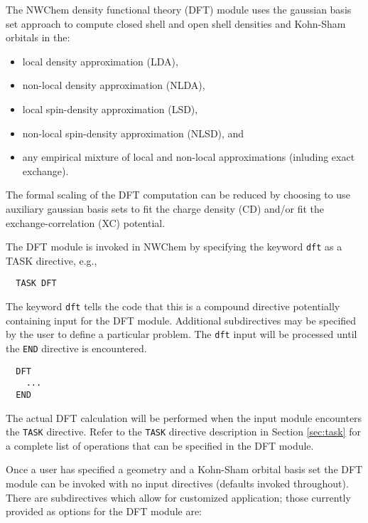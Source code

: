 \label{sec:dft}

The NWChem density functional theory (DFT) module uses the
gaussian basis set approach to compute
closed shell and open shell densities and Kohn-Sham orbitals
in the: 
\begin{itemize}
\item local density approximation (LDA), 
\item non-local density approximation (NLDA), 
\item local spin-density approximation (LSD), 
\item non-local spin-density approximation (NLSD), and
\item any empirical mixture of local and non-local approximations 
(inluding exact exchange).
\end{itemize}

The formal scaling of the DFT computation can be reduced by choosing
to use auxiliary gaussian basis sets to fit the charge density (CD) and/or 
fit the exchange-correlation (XC) potential.

The DFT module is invoked in NWChem 
by specifying the keyword \verb+dft+ as a TASK directive, e.g.,

\begin{verbatim}
  TASK DFT
\end{verbatim}

The keyword \verb+dft+ tells the code that this is a compound directive
potentially containing input for the DFT module.  Additional subdirectives
may be specified by the user to define a particular
problem.  The \verb+dft+ input will be processed until the
\verb+END+ directive is encountered.  

\begin{verbatim}
  DFT
    ...
  END
\end{verbatim}

The actual DFT calculation will
be performed when the input module encounters the \verb+TASK+ directive.
Refer to the \verb+TASK+ directive description in
Section \ref{sec:task} for a complete list of operations that can be
specified in the DFT module.  

Once a user has specified a geometry and a Kohn-Sham orbital basis set
the DFT module can be invoked with no input directives (defaults 
invoked throughout).  There are subdirectives which allow for 
customized application; those currently provided as options for 
the DFT module are:

